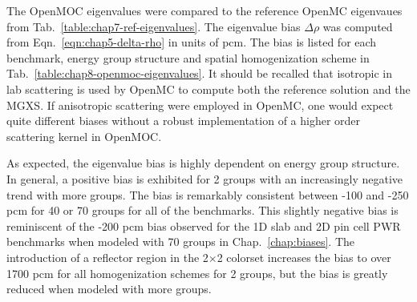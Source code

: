 The OpenMOC eigenvalues were compared to the reference OpenMC eigenvaues from Tab.~\ref{table:chap7-ref-eigenvalues}. The eigenvalue bias $\Delta\rho$ was computed from Eqn.~\ref{eqn:chap5-delta-rho} in units of \ac{pcm}. The bias is listed for each benchmark, energy group structure and spatial homogenization scheme in Tab.~\ref{table:chap8-openmoc-eigenvalues}. It should be recalled that isotropic in lab scattering is used by OpenMC to compute both the reference solution and the \ac{MGXS}. If anisotropic scattering were employed in OpenMC, one would expect quite different biases without a robust implementation of a higher order scattering kernel in OpenMOC.

As expected, the eigenvalue bias is highly dependent on energy group structure. In general, a positive bias is exhibited for 2 groups with an increasingly negative trend with more groups. The bias is remarkably consistent between -100 and -250 \ac{pcm} for 40 or 70 groups for all of the benchmarks. This slightly negative bias is reminiscent of the -200 \ac{pcm} bias observed for the 1D slab and 2D pin cell \ac{PWR} benchmarks when modeled with 70 groups in Chap.~\ref{chap:biases}. The introduction of a reflector region in the 2$\times$2 colorset increases the bias to over 1700 \ac{pcm} for all homogenization schemes for 2 groups, but the bias is greatly reduced when modeled with more groups.


\renewcommand{\arraystretch}{0.9}%

